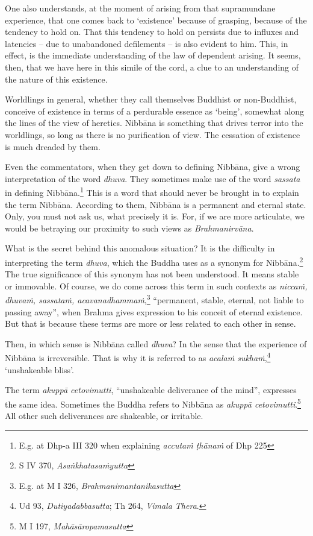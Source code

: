 One also understands, at the moment of arising from that supramundane experience, that one comes back to `existence' because of grasping, because of the tendency to hold on. That this tendency to hold on persists due to influxes and latencies -- due to unabandoned defilements -- is also evident to him. This, in effect, is the immediate understanding of the law of dependent arising. It seems, then, that we have here in this simile of the cord, a clue to an understanding of the nature of this existence.

Worldlings in general, whether they call themselves Buddhist or non-Buddhist, conceive of existence in terms of a perdurable essence as `being', somewhat along the lines of the view of heretics. Nibbāna is something that drives terror into the worldlings, so long as there is no purification of view. The cessation of existence is much dreaded by them.

Even the commentators, when they get down to defining Nibbāna, give a wrong interpretation of the word \emph{dhuva}. They sometimes make use of the word \emph{sassata} in defining Nibbāna.\footnote{E.g. at Dhp-a III 320 when explaining \emph{accutaṁ ṭhānaṁ} of Dhp 225} This is a word that should never be brought in to explain the term Nibbāna. According to them, Nibbāna is a permanent and eternal state. Only, you must not ask us, what precisely it is. For, if we are more articulate, we would be betraying our proximity to such views as \emph{Brahmanirvāna}.

What is the secret behind this anomalous situation? It is the difficulty in interpreting the term \emph{dhuva}, which the Buddha uses as a synonym for Nibbāna.\footnote{S IV 370, \emph{Asaṅkhatasaṁyutta}} The true significance of this synonym has not been understood. It means stable or immovable. Of course, we do come across this term in such contexts as \emph{niccaṁ, dhuvaṁ, sassataṁ, acavanadhammaṁ},\footnote{E.g. at M I 326, \emph{Brahmanimantanikasutta}} ``permanent, stable, eternal, not liable to passing away'', when Brahma gives expression to his conceit of eternal existence. But that is because these terms are more or less related to each other in sense.

Then, in which sense is Nibbāna called \emph{dhuva}? In the sense that the experience of Nibbāna is irreversible. That is why it is referred to as \emph{acalaṁ sukhaṁ},\footnote{Ud 93, \emph{Dutiyadabbasutta}; Th 264, \emph{Vimala Thera}.} `unshakeable bliss'.

The term \emph{akuppā cetovimutti}, ``unshakeable deliverance of the mind'', expresses the same idea. Sometimes the Buddha refers to Nibbāna as \emph{akuppā cetovimutti}.\footnote{M I 197, \emph{Mahāsāropamasutta}} All other such deliverances are shakeable, or irritable.

